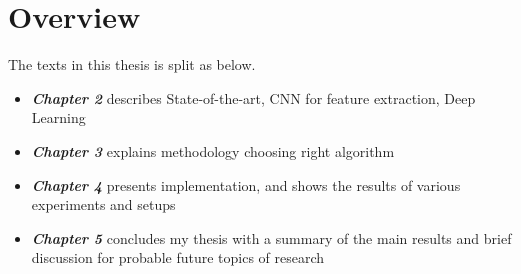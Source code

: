 \section{Overview}
The texts in this thesis is split as below.
\begin{itemize}
  \item {\textbf {\textit{Chapter 2}} describes State-of-the-art, CNN for feature extraction, Deep Learning}
  \item {\textbf {\textit{Chapter 3}} explains methodology choosing right algorithm}
	\item {\textbf {\textit{Chapter 4}} presents implementation, and shows the results of various experiments and setups  }
	\item {\textbf {\textit{Chapter 5}} concludes my thesis with a summary of the main results and brief discussion for probable future topics of research}
\end{itemize}